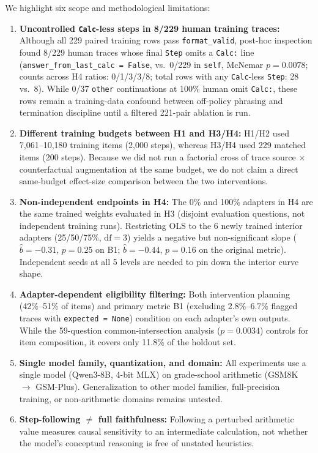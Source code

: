 \documentclass[11pt]{article}
\begin{document}
We highlight six scope and methodological limitations:
\begin{enumerate}
    \setlength{\itemsep}{2pt}
    \item \textbf{Uncontrolled \texttt{Calc}-less steps in 8/229 human training traces:} Although all 229 paired training rows pass \texttt{format\_valid}, post-hoc inspection found 8/229 human traces whose final \texttt{Step} omits a \texttt{Calc:} line (\texttt{answer\_from\_last\_calc = False}, vs.\ 0/229 in \texttt{self}, McNemar $p=0.0078$; counts across H4 ratios: 0/1/3/3/8; total rows with any \texttt{Calc}-less \texttt{Step}: 28 vs.\ 8). While 0/37 \texttt{other} continuations at 100\% human omit \texttt{Calc:}, these rows remain a training-data confound between off-policy phrasing and termination discipline until a filtered 221-pair ablation is run.
    \item \textbf{Different training budgets between H1 and H3/H4:} H1/H2 used 7,061--10,180 training items (2,000 steps), whereas H3/H4 used 229 matched items (200 steps). Because we did not run a factorial cross of trace source $\times$ counterfactual augmentation at the same budget, we do not claim a direct same-budget effect-size comparison between the two interventions.
    \item \textbf{Non-independent endpoints in H4:} The 0\% and 100\% adapters in H4 are the same trained weights evaluated in H3 (disjoint evaluation questions, not independent training runs). Restricting OLS to the 6 newly trained interior adapters (25/50/75\%, $\text{df}=3$) yields a negative but non-significant slope ($\hat b = -0.31$, $p = 0.25$ on B1; $\hat b = -0.44$, $p = 0.16$ on the original metric). Independent seeds at all 5 levels are needed to pin down the interior curve shape.
    \item \textbf{Adapter-dependent eligibility filtering:} Both intervention planning (42\%--51\% of items) and primary metric B1 (excluding 2.8\%--6.7\% flagged traces with \texttt{expected = None}) condition on each adapter's own outputs. While the 59-question common-intersection analysis ($p = 0.0034$) controls for item composition, it covers only 11.8\% of the holdout set.
    \item \textbf{Single model family, quantization, and domain:} All experiments use a single model (Qwen3-8B, 4-bit MLX) on grade-school arithmetic (GSM8K $\to$ GSM-Plus). Generalization to other model families, full-precision training, or non-arithmetic domains remains untested.
    \item \textbf{Step-following $\ne$ full faithfulness:} Following a perturbed arithmetic value measures causal sensitivity to an intermediate calculation, not whether the model's conceptual reasoning is free of unstated heuristics.
\end{enumerate}
\end{document}
